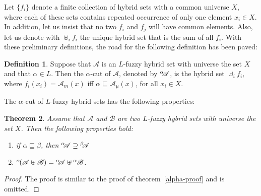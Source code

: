 \documentclass{amsart}
\newtheorem{theorem}{Theorem}[section]
\theoremstyle{definition}
\newtheorem{definition}[theorem]{Definition}
\begin{document}
Let $\{f_{i}\}$ denote a finite collection of hybrid sets with a common universe
$X$, where each of these sets contains repeated occurrence of only one element 
$x_{i}\in X$. In addition, let us insist that no two $f_{i}$ and $f_{j}$ will have common
elements. Also, let us denote with $\uplus_{i}f_{i}$ the unique hybrid set that is the sum
of all $f_{i}$. With these preliminary definitions, the road for the following definition 
has been paved:
\begin{definition}
Suppose that $\mathscr{A}$ is an 
$L$-fuzzy hybrid set with universe the set $X$ and that 
$\alpha\in L$. Then the $\alpha$-cut of $\mathscr{A}$, denoted by
${}^{\alpha}\kern-0.25em\mathscr{A}$, is the hybrid set $\uplus_{i}f_{i}$, where
$f_{i}(x_{i})=\mathscr{A}_{m}(x)$ iff $\alpha\sqsubseteq\mathscr{A}_{\mu}(x)$, for all
$x_{i}\in X$.
\end{definition}
The $\alpha$-cut of $L$-fuzzy hybrid sets has the following properties:
\begin{theorem}
Assume that $\mathscr{A}$ and $\mathscr{B}$ are two $L$-fuzzy hybrid sets 
with universe the set $X$. Then the following properties hold:
\begin{enumerate}
\item if $\alpha\sqsubseteq\beta$, then 
${}^{\alpha}\kern-0.25em\mathscr{A}\supseteq {}^{\beta}\kern-0.25em\mathscr{A}$
\item  $^{\alpha}\kern-0.15em(\mathscr{A}\uplus\mathscr{B})=
{}^{\alpha}\kern-0.25em\mathscr{A}\uplus{}^{\alpha}\kern-0.05em\mathscr{B}$.
\end{enumerate}
\end{theorem}
\begin{proof}
The proof is similar to the proof of theorem~\ref{alpha-proof} and is
omitted.
\end{proof}
\end{document}
